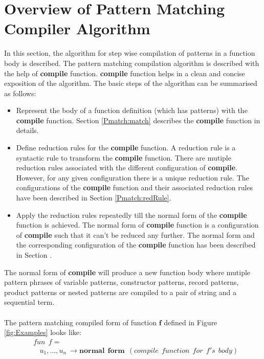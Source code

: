 \documentclass[11pt]{article}
\begin{document}
\section {Overview of Pattern Matching Compiler Algorithm}
In this section, the algorithm for step wise compilation of patterns in a function body is described. The pattern matching compilation algorithm is described with the help of {\bf compile} function. {\bf compile} function helps in a clean and concise exposition of the algorithm. The basic steps of the algorithm can be summarised as follows:
\begin{itemize}
  \item Represent the body of a function definition (which has patterns) with the {\bf compile} function. Section \ref{Pmatch:match} describes the {\bf compile} function in details. 

  \item Define reduction rules for the {\bf compile} function. A reduction rule is a syntactic rule to transform the {\bf compile} function. There are mutiple reduction rules associated with the different configuration of {\bf compile}. However, for any given configuration there is a unique reduction rule. The configurations of the {\bf compile} function and their associated reduction rules have been described in Section \ref {Pmatch:redRule}.

  \item Apply the reduction rules repeatedly till the normal form of the {\bf compile} function is achieved. The normal form of {\bf compile} function is a configuration of {\bf compile} such that it can't be reduced any further. The normal form and the corresponding configuration of the {\bf compile} function has been described in Section {}.
\end{itemize}
The normal form of {\bf compile} will produce a new function body where mutiple pattern phrases of variable patterns, constructor patterns, record patterns, product patterns or nested patterns are compiled to a pair of string and a sequential term.
~~\\~~\\ 
The pattern matching compiled form of function $\mathbf{f}$ defined in Figure \ref {fig:Examples} looks like:
\begin{align*} 
&fun~~f = \\
&~~~~ u_1,\ldots,u_n ~\to \mathbf{normal~~form}~~(\mathit{compile}~~function~~for~~f's~~body)
\end{align*} 
\end{document}
